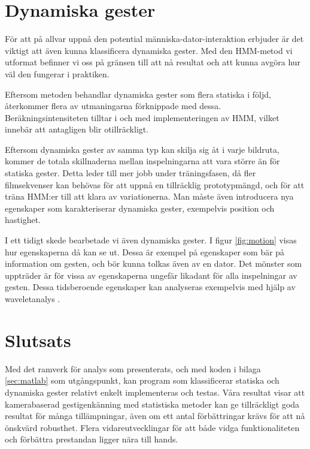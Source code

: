 \documentclass[../rapport_MVEX01-11-05]{subfiles}
\begin{document}
\section{Dynamiska gester}
För att på allvar uppnå den potential människa-dator-interaktion erbjuder
är det viktigt att även kunna klassificera dynamiska gester.
Med den HMM-metod vi utformat befinner vi oss på gränsen till
att nå resultat och att kunna avgöra hur väl den fungerar i praktiken.

Eftersom metoden behandlar dynamiska gester som flera 
statiska i följd, återkommer flera av utmaningarna förknippade med dessa. 
Beräkningsintensiteten tilltar i och med implementeringen av HMM, vilket innebär 
att \MATLAB antagligen blir otillräckligt.

Eftersom dynamiska gester av samma typ kan skilja sig åt i varje bildruta,
kommer de totala skillnaderna mellan inspelningarna att vara större än för statiska
gester.
Detta leder till 
mer jobb under träningsfasen, då fler filmsekvenser kan behövas för att uppnå en 
tillräcklig prototypmängd, och för att träna HMM:er till att klara av variationerna. 
Man måste även introducera nya egenskaper som karakteriserar dynamiska gester, 
exempelvis position och hastighet.

I ett tidigt skede bearbetade vi även dynamiska gester.
I figur \vref{fig:motion} visas hur egenskaperna då kan se ut.
Dessa är exempel på egenskaper som bär på
information om gesten, och bör kunna tolkas även av en dator.
Det mönster som uppträder är för vissa av egenskaperna
ungefär likadant för alla inspelningar av gesten.
Dessa tidsberoende egenskaper kan analyseras exempelvis
med hjälp av waveletanalys \cite{Hastie09}. 

\newpage
\section{Slutsats}
Med det ramverk för analys som presenterats, och med koden i bilaga
\ref{sec:matlab} som utgångspunkt, kan program som klassificerar
statiska och dynamiska gester relativt enkelt
implementeras och testas. Våra resultat visar att kamerabaserad
gestigenkänning med statistiska metoder kan ge tillräckligt goda resultat
för många tillämpningar, även om ett antal förbättringar krävs för att
nå önskvärd robusthet.
Flera vidareutvecklingar för att både vidga
funktionaliteten och förbättra prestandan ligger nära till hands.
\end{document}
